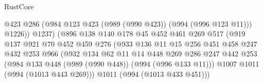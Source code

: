 \begin{lexlean}{RustCore}
\begin{coremodule}
                                          @423
                                          @286
                                          (@984 @123 @423 (@989 (@990 @423)) (@994 (@996 @123 @11)))
                                          @1226))
                                      @1237)
                                    (@896
                                      @138
                                      @140
                                      @178
                                      @45
                                      @452
                                      @461
                                      @269
                                      @517
                                      (@919
                                        @137
                                        @921
                                        @70
                                        @452
                                        @459
                                        @276
                                        (@933
                                          @136
                                          @11
                                          @15
                                          @256
                                          @451
                                          @458
                                          @247
                                          @432
                                          @253
                                          @966
                                          (@932
                                            @134
                                            @62
                                            @11
                                            @14
                                            @448
                                            @269
                                            @286
                                            @247
                                            @442
                                            @253
                                            (@984
                                              @133
                                              @448
                                              (@989 (@990 @448))
                                              (@994 (@996 @133 @11)))
                                            @1007
                                            @1011
                                            (@994 (@1013 @443 @269)))
                                          @1011
                                          (@994 (@1013 @433 @451)))

\end{coremodule}
\end{lexlean}
